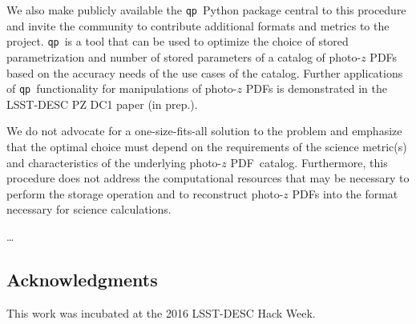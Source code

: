 \documentclass[\docopts]{\docclass}
\newcommand{\qp}{\texttt{qp}}
\newcommand{\pz}{photo-$z$ PDF}
\begin{document}
We also make publicly available the \qp\ Python package central to this 
procedure and invite the community to contribute additional formats and metrics 
to the project.  \qp\ is a tool that can be used to optimize the choice of 
stored parametrization and number of stored parameters of a catalog of \pz s 
based on the accuracy needs of the use cases of the catalog.  Further 
applications of \qp\ functionality for manipulations of \pz s is demonstrated 
in the LSST-DESC PZ DC1 paper (in prep.).

We do not advocate for a one-size-fits-all solution to the problem and 
emphasize that the optimal choice must depend on the requirements of the 
science metric(s) and characteristics of the underlying \pz\ catalog.  
Furthermore, this procedure does not address the computational resources that 
may be necessary to perform the storage operation and to reconstruct \pz s into 
the format necessary for science calculations.

\dots


\subsection*{Acknowledgments}


This work was incubated at the 2016 LSST-DESC Hack Week.







\end{document}
